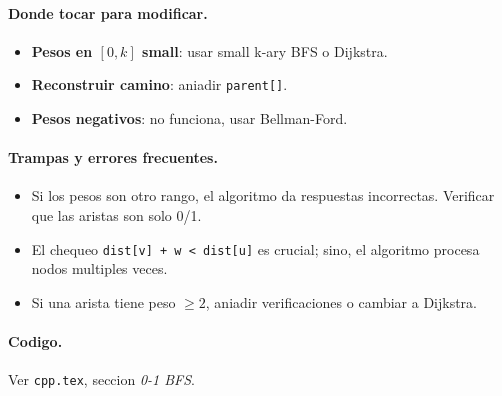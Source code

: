 \paragraph{Donde tocar para modificar.}
\begin{itemize}\setlength\itemsep{0pt}
	\item \textbf{Pesos en $[0, k]$ small}: usar small k-ary BFS o Dijkstra.
	\item \textbf{Reconstruir camino}: aniadir \texttt{parent[]}.
	\item \textbf{Pesos negativos}: no funciona, usar Bellman-Ford.
\end{itemize}

\paragraph{Trampas y errores frecuentes.}
\begin{itemize}\setlength\itemsep{0pt}
	\item Si los pesos son otro rango, el algoritmo da respuestas incorrectas. Verificar que las aristas son solo 0/1.
	\item El chequeo \texttt{dist[v] + w < dist[u]} es crucial; sino, el algoritmo procesa nodos multiples veces.
	\item Si una arista tiene peso $\ge 2$, aniadir verificaciones o cambiar a Dijkstra.
\end{itemize}

\paragraph{Codigo.}
Ver \texttt{cpp.tex}, seccion \textit{0-1 BFS}.

